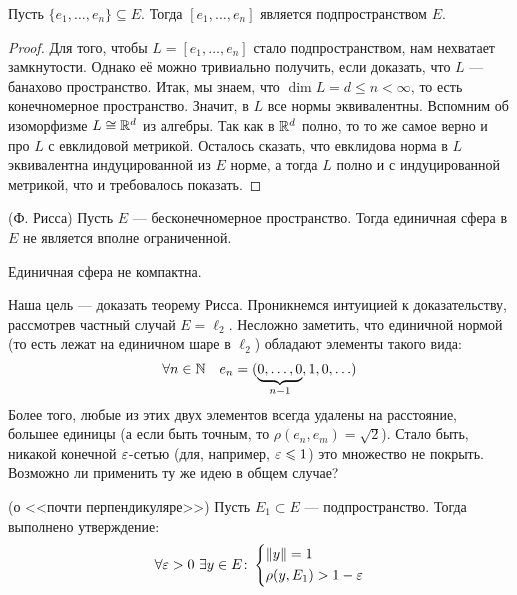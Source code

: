 \begin{theorem}
	Пусть $\{e_1, \ldots, e_n\} \subseteq E$. Тогда $[e_1, \ldots, e_n]$ является подпространством $E$.
\end{theorem}

\begin{proof}
	Для того, чтобы $L = [e_1, \ldots, e_n]$ стало подпространством, нам нехватает замкнутости. Однако её можно тривиально получить, если доказать, что $L$ --- банахово пространство. Итак, мы знаем, что $\dim L = d \le n < \infty$, то есть конечномерное пространство. Значит, в $L$ все нормы эквивалентны. Вспомним об изоморфизме $L \cong \mathbb{R}^d$ из алгебры. Так как в $\mathbb{R}^d$ полно, то то же самое верно и про $L$ с евклидовой метрикой. Осталось сказать, что евклидова норма в $L$ эквивалентна индуцированной из $E$ норме, а тогда $L$ полно и с индуцированной метрикой, что и требовалось показать.
\end{proof}

\begin{theorem} (Ф. Рисса)
	Пусть $E$ --- бесконечномерное пространство. Тогда единичная сфера в $E$ не является вполне ограниченной.
\end{theorem}

\begin{corollary}
	Единичная сфера не компактна.
\end{corollary}

\begin{note}
	Наша цель --- доказать теорему Рисса. Проникнемся интуицией к доказательству, рассмотрев частный случай $E = \ell_2$. Несложно заметить, что единичной нормой (то есть лежат на единичном шаре в $\ell_2$) обладают элементы такого вида:
	\[
		\forall n \in \mathbb{N}\quad e_n = (\underbrace{0, \ldots, 0}_{n - 1}, 1, 0, \ldots)
	\]
	Более того, любые из этих двух элементов всегда удалены на расстояние, большее единицы (а если быть точным, то $\rho(e_n, e_m) = \sqrt{2}$). Стало быть, никакой конечной $\varepsilon$-сетью (для, например, $\varepsilon \leqslant 1$) это множество не покрыть. Возможно ли применить ту же идею в общем случае?
\end{note}

\begin{lemma} (о <<почти перпендикуляре>>)
	Пусть $E_1 \subset E$ --- подпространство. Тогда выполнено утверждение:
	\[
		\forall \varepsilon > 0\ \exists y \in E \colon \left\{ \begin{aligned} 
			&{\|y\| = 1}
			\\
			&{\rho(y, E_1) > 1 - \varepsilon}
		 \end{aligned} \right.
	\]
\end{lemma}

